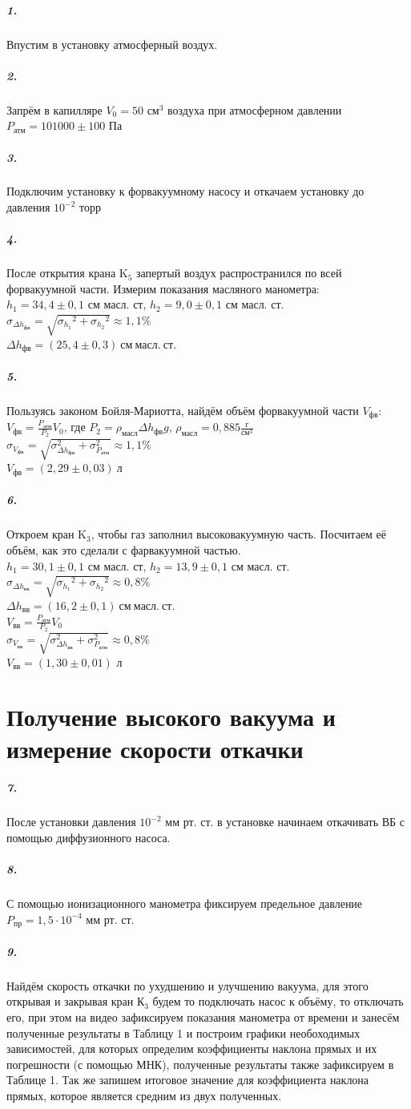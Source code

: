 \documentclass[a4paper,12pt]{article}
\begin{document}
\subparagraph{1.} Впустим в установку атмосферный воздух.
\subparagraph{2.}Запрём в капилляре $V_0=50$ $\text{см}^3$ воздуха при атмосферном давлении $P_\text{атм}=101000\pm 100$ Па
\subparagraph{3.}Подключим установку к форвакуумному насосу и откачаем установку до давления $10^{-2}$ торр
\subparagraph{4.}После открытия крана $\text{K}_5$ запертый воздух распространился по всей форвакуумной части. Измерим показания масляного манометра: \\
$h_1=34,4\pm 0,1$ см масл. ст, $h_2=9,0\pm 0,1$ см масл. ст. \\
$\sigma_{\Delta h_\text{фв}} = \sqrt{{\sigma_{ h_\text{1}}}^2 + {\sigma_{ h_\text{2}}}^2}\approx 1,1$\% \\
$\Delta h_{\text{фв}}= (25,4\pm 0,3)~ см~ масл. ~ст.$
\subparagraph{5.} Пользуясь законом Бойля-Мариотта, найдём объём форвакуумной части $V_\text{фв}$: \\
$V_\text{фв} = \frac{P_\text{атм}}{P_2}V_0$, где $P_2 = \rho_{масл}\Delta h_{\text{фв}}g$, $\rho_{масл}= 0,885\frac{\text{г}}{\text{см}^3}$ \\
$\sigma_{V_\text{фв}}=\sqrt{\sigma_{\Delta h_\text{фв}}^2 + \sigma_{P_\text{атм}}^2}\approx 1,1\%$ \\
$V_\text{фв} = (2,29\pm 0,03)~л$ 
\subparagraph{6.} Откроем кран $\text{K}_3$, чтобы газ заполнил высоковакуумную часть. Посчитаем её объём, как это сделали с фарвакуумной частью. \\
$h_1=30,1\pm 0,1$ см масл. ст, $h_2=13,9\pm 0,1$ см масл. ст. \\
$\sigma_{\Delta h_\text{вв}} = \sqrt{{\sigma_{ h_\text{1}}}^2 + {\sigma_{ h_\text{2}}}^2}\approx 0,8$\% \\
$\Delta h_{\text{вв}}= (16,2\pm 0,1)~ см~ масл. ~ст.$
\\
$V_\text{вв} = \frac{P_\text{атм}}{P_2}V_0$ \\
$\sigma_{V_\text{вв}}=\sqrt{\sigma_{\Delta h_\text{вв}}^2 + \sigma_{P_\text{атм}}^2}\approx 0,8\%$ \\
$V_\text{вв} = (1,30\pm 0,01)$ л

\section*{Получение высокого вакуума и измерение скорости откачки} 

\subparagraph{7.} После установки давления $10^{-2}$ мм рт. ст. в установке начинаем откачивать ВБ с помощью диффузионного насоса.
\subparagraph{8.} С помощью ионизационного манометра фиксируем предельное давление $P_\text{пр}=1,5 \cdot 10^{-4}$ мм рт. ст. 
\subparagraph{9.} Найдём скорость откачки по ухудшению и улучшению вакуума, для этого открывая и закрывая кран $К_3$ будем то подключать насос к объёму, то отключать его, при этом на видео зафиксируем показания манометра от времени и занесём полученные результаты в Таблицу 1 и построим графики необоходимых  зависимостей, для которых определим коэффициенты наклона прямых и их погрешности (с помощью МНК), полученные результаты также зафиксируем в Таблице 1. Так же запишем итоговое значение для коэффициента наклона прямых, которое является средним из двух полученных.
\end{document}
